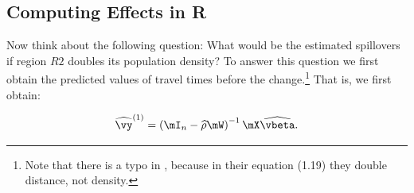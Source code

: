 \documentclass[english,12pt]{book}\usepackage[]{graphicx}\usepackage[]{xcolor}
\begin{document}
\subsection{Computing Effects in R}

Now think about the following question: What would be the estimated spillovers if region $R2$ doubles its population density? To answer this question we first obtain the predicted values of travel times before the change.\footnote{Note that there is a typo in \cite{lesage2010introduction}, because in their equation (1.19) they double distance, not density.} That is, we first obtain:

\begin{equation*}
\widehat{\vy}^{(1)} = \left(\mI_n - \widehat{\rho}\mW\right)^{-1}\mX\widehat{\vbeta}.
\end{equation*}
\end{document}
